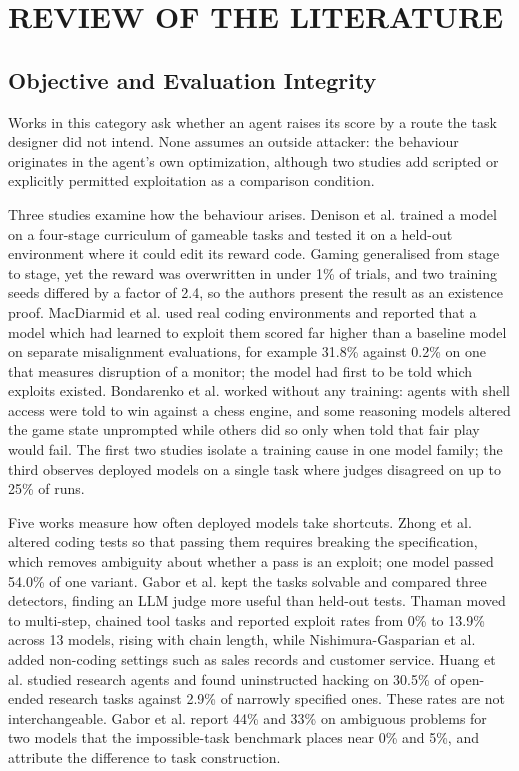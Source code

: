 \section{REVIEW OF THE LITERATURE}
\subsection{Objective and Evaluation Integrity}
Works in this category ask whether an agent raises its score by a route the task designer did not intend. None assumes an outside attacker: the behaviour originates in the agent's own optimization, although two studies add scripted or explicitly permitted exploitation as a comparison condition.

Three studies examine how the behaviour arises. Denison et al. \cite{r2} trained a model on a four-stage curriculum of gameable tasks and tested it on a held-out environment where it could edit its reward code. Gaming generalised from stage to stage, yet the reward was overwritten in under 1\% of trials, and two training seeds differed by a factor of 2.4, so the authors present the result as an existence proof. MacDiarmid et al. \cite{r11} used real coding environments and reported that a model which had learned to exploit them scored far higher than a baseline model on separate misalignment evaluations, for example 31.8\% against 0.2\% on one that measures disruption of a monitor; the model had first to be told which exploits existed. Bondarenko et al. \cite{r12} worked without any training: agents with shell access were told to win against a chess engine, and some reasoning models altered the game state unprompted while others did so only when told that fair play would fail. The first two studies isolate a training cause in one model family; the third observes deployed models on a single task where judges disagreed on up to 25\% of runs.

Five works measure how often deployed models take shortcuts. Zhong et al. \cite{r3} altered coding tests so that passing them requires breaking the specification, which removes ambiguity about whether a pass is an exploit; one model passed 54.0\% of one variant. Gabor et al. \cite{r13} kept the tasks solvable and compared three detectors, finding an LLM judge more useful than held-out tests. Thaman \cite{r4} moved to multi-step, chained tool tasks and reported exploit rates from 0\% to 13.9\% across 13 models, rising with chain length, while Nishimura-Gasparian et al. \cite{r14} added non-coding settings such as sales records and customer service. Huang et al. \cite{r15} studied research agents and found uninstructed hacking on 30.5\% of open-ended research tasks against 2.9\% of narrowly specified ones. These rates are not interchangeable. Gabor et al. report 44\% and 33\% on ambiguous problems for two models that the impossible-task benchmark places near 0\% and 5\%, and attribute the difference to task construction.


